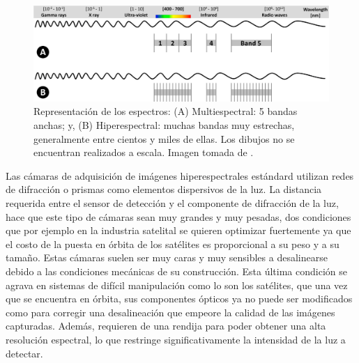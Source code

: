 \begin{figure}[H]
	\centering
	\includegraphics[scale=0.2]{Figs/plan_de_tesis/multivshyper.png}
	\caption{ Representación de los espectros: (A) Multiespectral: 5 
		bandas anchas; y, (B) Hiperespectral: muchas bandas muy estrechas, 
		generalmente entre cientos y miles de ellas. Los dibujos no se 
		encuentran 
		realizados a escala. Imagen tomada de \cite{Adao2017}.}
	\label{fig:spectrus}
\end{figure}


Las cámaras de adquisición de imágenes hiperespectrales estándard utilizan 
redes de difracción o prismas como elementos dispersivos de la luz. La 
distancia requerida entre el sensor de detección y  el componente de difracción 
de la luz, hace que este tipo de cámaras sean muy grandes y muy pesadas, dos 
condiciones que por ejemplo en la industria satelital se quieren optimizar 
fuertemente ya que el costo de la puesta en órbita de los satélites es 
proporcional a su peso y a su tamaño. Estas cámaras suelen ser muy caras y muy 
sensibles a desalinearse debido a las condiciones mecánicas de su construcción. 
Esta última condición se agrava en sistemas de difícil manipulación como lo son 
los satélites, que una vez que se encuentra en órbita, sus componentes ópticos 
ya no puede ser modificados como para corregir una desalineación que empeore la 
calidad de las imágenes capturadas. Además, requieren de una rendija 
para poder obtener una alta resolución espectral, lo que restringe 
significativamente la intensidad de la luz a detectar.

